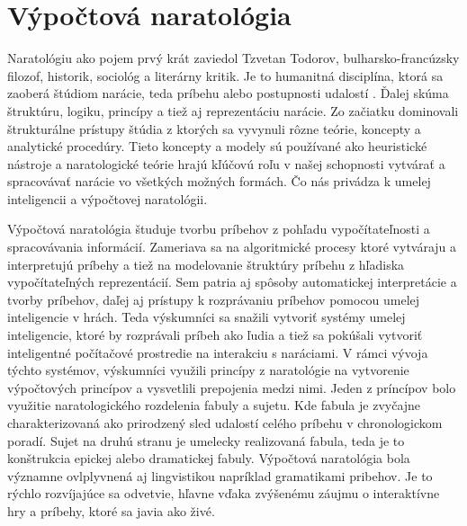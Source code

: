 \section{Výpočtová naratológia}
Naratológiu ako pojem prvý krát zaviedol Tzvetan Todorov, bulharsko-francúzsky filozof, historik, sociológ a literárny kritik. Je to humanitná disciplína, ktorá sa zaoberá štúdiom narácie, teda príbehu alebo postupnosti udalostí \cite{narrat}. Ďalej skúma štruktúru, logiku, princípy a tiež aj reprezentáciu narácie. Zo začiatku dominovali štrukturálne prístupy štúdia z ktorých sa vyvynuli rôzne teórie, koncepty a analytické procedúry. Tieto koncepty a modely sú používané ako heuristické nástroje a naratologické teórie hrajú kľúčovú roľu v našej schopnosti vytvárať a spracovávať narácie vo všetkých možných formách. Čo nás privádza k umelej inteligencii a výpočtovej naratológii.\par
Výpočtová naratológia študuje tvorbu príbehov z pohľadu vypočítateľnosti a spracovávania informácií. Zameriava sa na algoritmické procesy ktoré vytváraju a interpretujú príbehy a tiež na modelovanie štruktúry príbehu z hľadiska vypočítateľných reprezentácií. Sem patria aj spôsoby automatickej interpretácie a tvorby príbehov, daľej aj prístupy k rozprávaniu príbehov pomocou umelej inteligencie v hrách. Teda výskumníci sa snažili vytvoriť systémy umelej inteligencie, ktoré by rozprávali príbeh ako ľudia a tiež sa pokúšali vytvoriť inteligentné počítačové prostredie na interakciu s naráciami. V rámci vývoja týchto systémov, výskumníci využili princípy z naratológie na vytvorenie výpočtových princípov a vysvetlili prepojenia medzi nimi. Jeden z príncípov bolo využitie naratologického rozdelenia fabuly a sujetu. Kde fabula je zvyčajne charakterizovaná ako prirodzený sled udalostí celého príbehu v chronologickom poradí. Sujet na druhú stranu je umelecky realizovaná fabula, teda je to konštrukcia epickej alebo dramatickej fabuly. Výpočtová naratológia bola významne ovlplyvnená aj lingvistikou napríklad gramatikami pribehov. Je to rýchlo rozvíjajúce sa odvetvie, hľavne vďaka zvýšenému záujmu o interaktívne hry a príbehy, ktoré sa javia ako živé.
